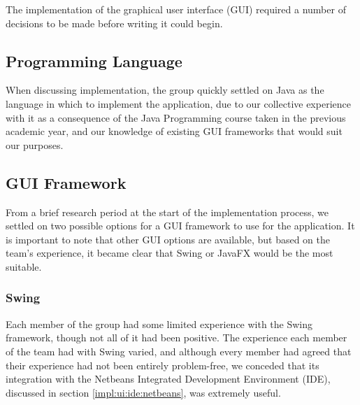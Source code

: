 The implementation of the graphical user interface (GUI) required a number
of decisions to be made before writing it could begin.



\subsection{Programming Language}
\label{impl:ui:programminglanguage}

When discussing implementation, the group quickly settled on Java as
the language in which to implement the application, due to our 
collective experience with it as a consequence of the Java Programming
course taken in the previous academic year, and our knowledge of
existing GUI frameworks that would suit our purposes.


\subsection{GUI Framework}
\label{impl:ui:guiframework}

From a brief research period at the start of the implementation 
process, we settled on two possible options for a GUI framework to use
for the application. It is important to note that other GUI options are
available, but based on the team's experience, it became clear that
Swing or JavaFX would be the most suitable.


\subsubsection{Swing}
\label{impl:ui:guiframework:swing}

Each member of the group had some limited experience with the Swing 
framework, though not all of it had been positive.
The experience each member of the team had with Swing varied, and
although every member had agreed that their experience had not been
entirely problem-free, we conceded that its integration with the Netbeans
Integrated Development Environment (IDE), discussed in section
\ref{impl:ui:ide:netbeans}, was extremely useful.

